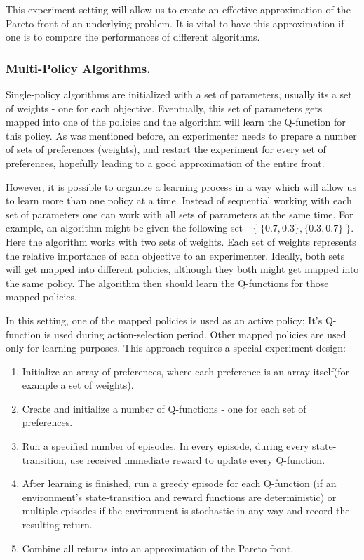 This experiment setting will allow us to create an effective approximation of the Pareto front of an underlying problem. It is vital to have this approximation if one is to compare the performances of different algorithms.

\subsubsection{Multi-Policy Algorithms.}
Single-policy algorithms are initialized with a set of parameters, usually its a set of weights - one for each objective. Eventually, this set of parameters gets mapped into one of the policies and the algorithm will learn the Q-function for this policy. As was mentioned before, an experimenter needs to prepare a number of sets of preferences (weights), and restart the experiment for every set of preferences, hopefully leading to a good approximation of the entire front.

However, it is possible to organize a learning process in a way which will allow us to learn more than one policy at a time. Instead of sequential working with each set of parameters one can work with all sets of parameters at the same time. For example, an algorithm might be given the following set - $ \{\;\{0.7,0.3\}, \{0.3,0.7\}\;\} $. Here the algorithm works with two sets of weights. Each set of weights represents the relative importance of each objective to an experimenter. Ideally, both sets will get mapped into different policies, although they both might get mapped into the same policy.  The algorithm then should learn the Q-functions for those mapped policies.

In this setting, one of the mapped policies is used as an active policy; It's Q-function is used during action-selection period. Other mapped policies are used only for learning purposes. This approach requires a special experiment design:
\begin{enumerate}
  \item Initialize an array of preferences, where each preference is an array itself(for example a set of weights).
  \item Create and initialize a number of Q-functions - one for each set of preferences.
  \item Run a specified number of episodes. In every episode, during every state-transition, use received immediate reward to update every Q-function.
  \item After learning is finished, run a greedy episode for each Q-function (if an environment's state-transition and reward functions are deterministic) or multiple episodes if the environment is stochastic in any way and record the resulting return.
  \item Combine all returns into an approximation of the Pareto front.
\end{enumerate}

